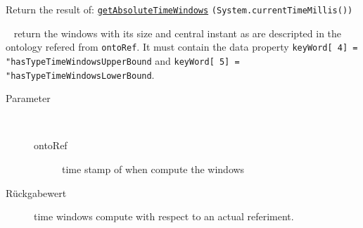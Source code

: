 \begin{description}
\begin{description}
 Return the result of: \texttt{\hyperlink{ontologyFramework.OFDataMapping.ReservatedDataType.TimeWindow.getAbsoluteTimeWindows(java.lang.Long)}{getAbsoluteTimeWindows}} \verb!(System.currentTimeMillis())!
\end{description}
\item[{\ltdHypertarget{ontologyFramework.OFDataMapping.ReservatedDataType.TimeWindow.getAbsoluteTimeWindows(ontologyFramework.OFContextManagement.OWLReferences)}{getAbsoluteTimeWindows}\label{ontologyFramework.OFDataMapping.ReservatedDataType.TimeWindow.getAbsoluteTimeWindows(ontologyFramework.OFContextManagement.OWLReferences)}}]
~ return the windows with its size and central instant  as are descripted 
 in the ontology refered from \verb!ontoRef!. It must contain the data
 property \verb!keyWord[ 4] = "hasTypeTimeWindowsUpperBound! 
 and \verb!keyWord[ 5] = "hasTypeTimeWindowsLowerBound!.
\begin{description}
\item[Parameter] ~
\begin{description}
\item[ontoRef]
time stamp of when compute the windows
\end{description}
\item[Rückgabewert] 
time windows compute with respect to an actual referiment.
\end{description}
\end{description}
